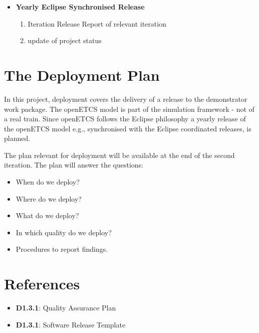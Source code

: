 \documentclass{template/openetcs_report}
\begin{document}
\begin{description}
\begin{itemize}
\item \textbf{Yearly Eclipse Synchronised Release}
\begin{enumerate}
\item Iteration Release Report of relevant iteration
\item update of project status
\end{enumerate}

\end{itemize}

\chapter{The Deployment Plan}

In this project, deployment covers the delivery of a release to the demonstrator work package. The openETCS model is part of the simulation framework - not of a real train. Since openETCS follows the Eclipse philosophy a yearly release of the openETCS model e.g., synchronised with the Eclipse coordinated releases, is planned. 

The plan relevant for deployment will be available at the end of the second iteration.
The plan will answer the questions:
\begin {itemize}
\item When do we deploy?
\item Where do we deploy?
\item What do we deploy?
\item In which quality do we deploy?
\item Procedures to report findings.
\end{itemize}
\end{description}

\chapter{References}
\begin{itemize}
\item \textbf{D1.3.1}: Quality Assurance Plan
\item \textbf{D1.3.1}: Software Release Template
\end{itemize}





\nocite{*}
\end{document}
